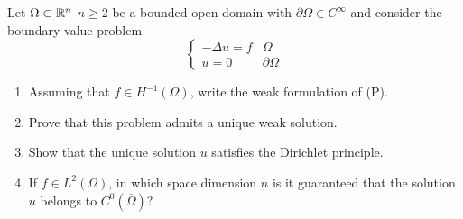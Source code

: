 \newpage
\begin{exercise}
    Let \(\Omega \subset \mathbb{R}^n\) \(n \geq 2\) be a bounded open domain with \(\partial\Omega \in C^\infty\) and consider the boundary value problem
    \[
        \begin{cases}
            -\Delta u = f & \Omega         \\
            u = 0         & \partial\Omega
        \end{cases}
        \tag*{(P)}
    \]
    \begin{enumerate}
        \item Assuming that \(f \in H^{-1}(\Omega)\), write the weak formulation of (P).
        \item Prove that this problem admits a unique weak solution.
        \item Show that the unique solution \(u\) satisfies the Dirichlet principle.
        \item If \(f \in L^2(\Omega)\), in which space dimension \(n\) is it guaranteed that
              the solution \(u\) belongs to \(C^0(\overline{\Omega})\)?
    \end{enumerate}
\end{exercise}
